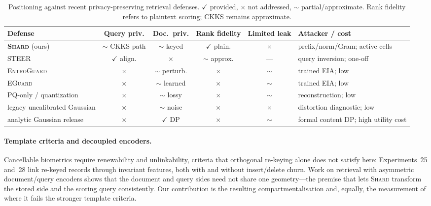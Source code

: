 \begin{table}[tbp]
\begin{singlespace}
\centering
\caption{Positioning against recent privacy-preserving retrieval defenses.
$\checkmark$ provided, $\times$ not addressed, $\sim$ partial/approximate.
Rank fidelity refers to plaintext scoring; CKKS remains approximate.}
\label{tab:defense-compare}
\scriptsize
\setlength{\tabcolsep}{2.2pt}
\begin{adjustbox}{max width=\linewidth}
\begin{tabular}{@{}lccccl@{}}
\toprule
Defense & Query priv. & Doc.\ priv. & Rank fidelity & Limited leak & Attacker / cost \\ \midrule
\textbf{\textsc{Shard}} (ours) & $\sim$ CKKS path & $\sim$ keyed & $\checkmark$ plain. & $\times$ & prefix/norm/Gram; active cells \\
\textsc{STEER}~\cite{ref_steer} & $\checkmark$ align. & $\times$ & $\sim$ approx. & --- & query inversion; one-off \\
\textsc{EntroGuard}~\cite{ref_entroguard} & $\times$ & $\sim$ perturb. & $\times$ & $\sim$ & trained EIA; low \\
\textsc{EGuard}~\cite{ref_eguard} & $\times$ & $\sim$ learned & $\times$ & $\sim$ & trained EIA; low \\
PQ-only / quantization & $\times$ & $\sim$ lossy & $\times$ & $\sim$ & reconstruction; low \\
legacy uncalibrated Gaussian & $\times$ & $\sim$ noise & $\times$ & $\times$ & distortion diagnostic; low \\
analytic Gaussian release~\cite{ref_analytic_gaussian} & $\times$ & $\checkmark$ DP & $\times$ & $\sim$ & formal content DP; high utility cost \\
\bottomrule
\end{tabular}
\end{adjustbox}
\end{singlespace}
\end{table}

\paragraph{Template criteria and decoupled encoders.}
Cancellable biometrics \cite{ref_cancellable} require renewability and
unlinkability, criteria that orthogonal re-keying alone does not satisfy here:
Experiments~25 and~28 link re-keyed records through invariant features, both
with and without insert/delete churn. Work on
retrieval with asymmetric
document/query encoders \cite{ref_dpr,ref_colbert} shows that the
document and query sides need not share one geometry---the premise that lets
\textsc{Shard} transform the stored side and the scoring query consistently.
Our contribution is the resulting compartmentalisation and, equally, the
measurement of where it fails the stronger template criteria.

